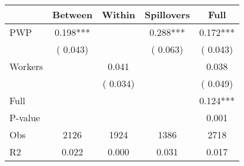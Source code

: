 
\begin{tabular}{l*{4}{c}}\hline&\multicolumn{1}{c}{Between}&\multicolumn{1}{c}{Within}&\multicolumn{1}{c}{Spillovers}&\multicolumn{1}{c}{Full}\\ \hline
 PWP           &              0.198***      &                                               &        0.288*** &         0.172***                            \\ 
                               &        (       0.043)           &                                       &       (       0.063)     &      (       0.043)                                           \\ 
 Workers       &                                               &        0.041    &                                &             0.038                            \\ 
                               &                                               & (       0.034)                  &                                        &      (       0.049)                                           \\ 
\hline                                                                                                                                                                                                                                            
 Full                  &                                               &                                               &                                        &             0.124***                                     \\ 
 P-value               &                                               &                                               &                                        &             0.001                                           \\ 
 Obs                   &               2126               &       1924                       &       1386                &              2718                                               \\ 
 R2                    &                      0.022              &              0.000                      &              0.031               &                     0.017                                              \\ 
\hline \end{tabular}                                                                                                                                                                                                              